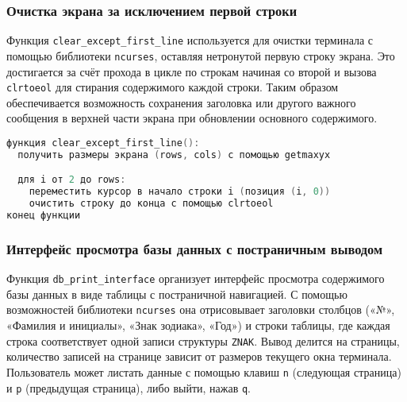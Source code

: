 \subsubsection*{Очистка экрана за исключением первой строки}
Функция \texttt{clear\_except\_first\_line} используется для очистки терминала с помощью библиотеки \texttt{ncurses}, оставляя нетронутой первую строку экрана. Это достигается за счёт прохода в цикле по строкам начиная со второй и вызова \texttt{clrtoeol} для стирания содержимого каждой строки. Таким образом обеспечивается возможность сохранения заголовка или другого важного сообщения в верхней части экрана при обновлении основного содержимого.

\begin{lstlisting}[language=C, caption=Функция clear\_except\_first\_line]
функция clear_except_first_line():
  получить размеры экрана (rows, cols) с помощью getmaxyx

  для i от 2 до rows:
    переместить курсор в начало строки i (позиция (i, 0))
    очистить строку до конца с помощью clrtoeol
конец функции
\end{lstlisting}

\subsubsection*{Интерфейс просмотра базы данных с постраничным выводом}
Функция \texttt{db\_print\_interface} организует интерфейс просмотра содержимого базы данных в виде таблицы с постраничной навигацией. С помощью возможностей библиотеки \texttt{ncurses} она отрисовывает заголовки столбцов («№», «Фамилия и инициалы», «Знак зодиака», «Год») и строки таблицы, где каждая строка соответствует одной записи структуры \texttt{ZNAK}. Вывод делится на страницы, количество записей на странице зависит от размеров текущего окна терминала. Пользователь может листать данные с помощью клавиш \texttt{n} (следующая страница) и \texttt{p} (предыдущая страница), либо выйти, нажав \texttt{q}.

